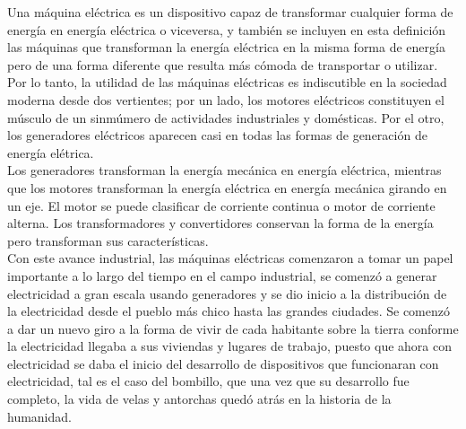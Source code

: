 \documentclass[12pt,titlepage]{article}
\begin{document}

Una máquina eléctrica es un dispositivo capaz de transformar cualquier forma de energía en energía eléctrica o viceversa, y también se incluyen en esta definición las máquinas que transforman la energía eléctrica en la misma forma de energía pero de una forma diferente que resulta más cómoda de transportar o utilizar.  \\[0.15mm]

Por lo tanto, la utilidad  de las máquinas eléctricas es indiscutible en la sociedad moderna desde dos vertientes; por un lado, los motores eléctricos constituyen el músculo de un sinmúmero de actividades industriales y domésticas. Por el otro, los generadores eléctricos aparecen casi en todas las formas de generación de energía elétrica.\\[0.15mm]

Los generadores transforman la energía mecánica en energía eléctrica, mientras que los motores transforman la energía eléctrica en energía mecánica girando en un eje. El motor se puede clasificar de corriente continua o motor de corriente alterna. Los transformadores y convertidores conservan la forma de la energía pero transforman sus características. \\[0.15mm]

Con este avance industrial, las máquinas eléctricas comenzaron a tomar un papel importante a lo largo del tiempo en el campo industrial, se comenzó a generar electricidad a gran escala usando generadores y se dio inicio a la distribución de la electricidad desde el pueblo más chico hasta las grandes ciudades. 
Se comenzó a dar un nuevo giro a la forma de vivir de cada habitante sobre la tierra conforme la electricidad llegaba a sus viviendas y lugares de trabajo, puesto que ahora con electricidad se daba  el inicio del desarrollo de dispositivos que funcionaran con electricidad, tal es el caso del bombillo, que una vez que su desarrollo fue completo, la vida de velas y antorchas quedó atrás en la historia de la humanidad. \\[0.8mm] 
\end{document}
